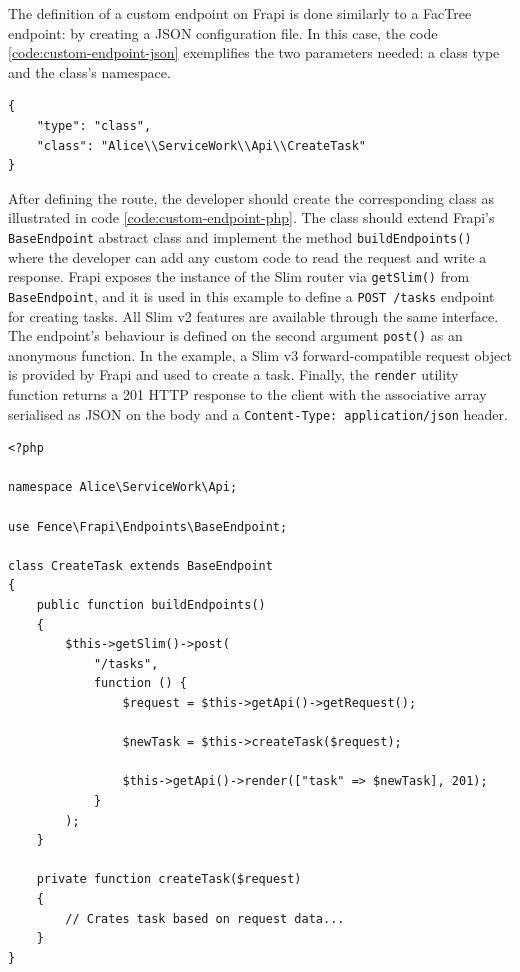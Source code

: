 The definition of a custom endpoint on Frapi is done similarly to a FacTree endpoint: by creating a JSON configuration file. In this case, the code \autoref{code:custom-endpoint-json} exemplifies the two parameters needed: a class type and the class's namespace.

\begin{listing}[htbp]
\begin{verbatim}
{
    "type": "class",
    "class": "Alice\\ServiceWork\\Api\\CreateTask"
}
\end{verbatim}
\caption{Configuration file for custom endpoints.}
\label{code:custom-endpoint-json}
\end{listing}

After defining the route, the developer should create the corresponding class as illustrated in code \autoref{code:custom-endpoint-php}. The class should extend Frapi's \texttt{BaseEndpoint} abstract class and implement the method \texttt{buildEndpoints()}  where the developer can add any custom code to read the request and write a response. Frapi exposes the instance of the Slim router via \texttt{getSlim()} from \texttt{BaseEndpoint}, and it is used in this example to define a \texttt{POST /tasks} endpoint for creating tasks. All Slim v2 features \cite{slim-2-doc} are available through the same interface. The endpoint's behaviour is defined on the second argument \texttt{post()} as an anonymous function. In the example, a Slim v3 forward-compatible request object is provided by Frapi and used to create a task. Finally, the \texttt{render} utility function returns a 201 HTTP response to the client with the associative array serialised as JSON on the body and a \texttt{Content-Type: application/json} header.

\begin{listing}[htbp]
\begin{verbatim}
<?php

namespace Alice\ServiceWork\Api;

use Fence\Frapi\Endpoints\BaseEndpoint;

class CreateTask extends BaseEndpoint
{
    public function buildEndpoints()
    {
        $this->getSlim()->post(
            "/tasks",
            function () {
			    $request = $this->getApi()->getRequest();
			    
                $newTask = $this->createTask($request);
                
                $this->getApi()->render(["task" => $newTask], 201);
            }
        );
    }
    
    private function createTask($request)
    {
        // Crates task based on request data...
    }
}
\end{verbatim}
\caption{PHP class with the custom endpoint definition for creating a Service Work task.}
\label{code:custom-endpoint-php}
\end{listing}


